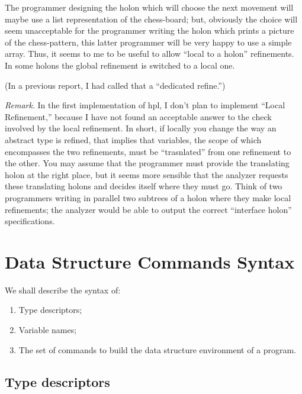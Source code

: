 \documentclass[openany,nobib]{tufte-book}
\begin{document}
The programmer designing the holon which will choose the next movement will
maybe use a list representation of the chess-board; but, obviously the choice
will seem unacceptable for the programmer writing the holon which prints a
picture of the chess-pattern, this latter programmer will be very happy to use
a simple array. Thus, it seems to me to be useful to allow ``local to a holon''
refinements. In some holons the global refinement is switched to a local one.

(In a previous report, I had called that a ``dedicated refine.'')

\bigskip\noindent
{\sl Remark}. In the first implementation of {\sc hpl}, I don't plan to
implement ``Local Refinement,'' because I have not found an acceptable answer
to the check involved by the local refinement. In short, if locally you change
the way an abstract type is refined, that implies that variables, the scope of
which encompasses the two refinements, must be ``trasnlated'' from one
refinement to the other. You may assume that the programmer must provide the
translating holon at the right place, but it seems more sensible that the
analyzer requests these translating holons and decides itself where they must
go. Think of two programmers writing in parallel two subtrees of a holon where
they make local refinements; the analyzer would be able to output the correct
``interface holon'' specifications.

\chapter{Data Structure Commands Syntax}

We shall describe the syntax of:
\begin{enumerate}
    \item Type descriptors;
    \item Variable names;
    \item The set of commands to build the data structure environment of a
program.
\end{enumerate}

\section{Type descriptors}
\label{sec:type-descriptors}
\end{document}
